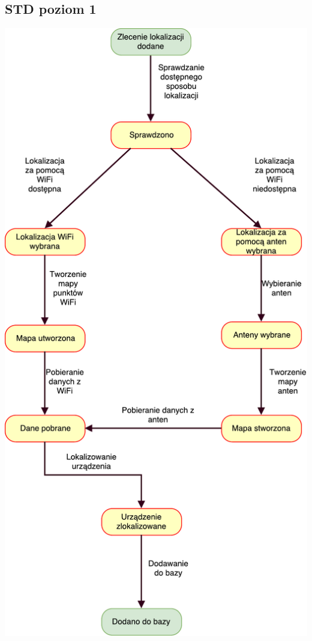 \documentclass[11pt]{article}
\begin{document}
	\subsection{STD poziom 1}
	\begin{center}
		\includegraphics[scale=0.9]{STD1.pdf}
	\end{center}
	\newpage
\end{document}
